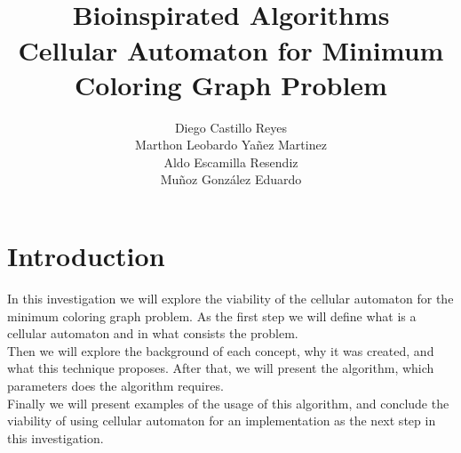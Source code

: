 \documentclass{article}
\title{\Huge{\textbf{}}\\
\Large{\textbf{Bioinspirated Algorithms\\ Cellular Automaton for Minimum Coloring Graph Problem}}}
\author{Diego Castillo Reyes\\Marthon Leobardo Yañez Martinez\\Aldo Escamilla Resendiz\\Muñoz González Eduardo}
\begin{document}
    \maketitle
    \newpage
    \tableofcontents
    \newpage
    \section{Introduction}
        In this investigation we will explore the viability of the cellular automaton for the minimum coloring graph problem.
        As the first step we will define what is a cellular automaton and in what consists the problem.\\ 
        Then we will explore the background of each concept, why it was created, and what this technique proposes. After that, 
        we will present the algorithm, which parameters does the algorithm requires. 
        \\Finally we will present examples of the usage of this
        algorithm, and conclude the viability of using cellular automaton for an implementation as the next step in this investigation.
    \newpage

    
\end{document}
